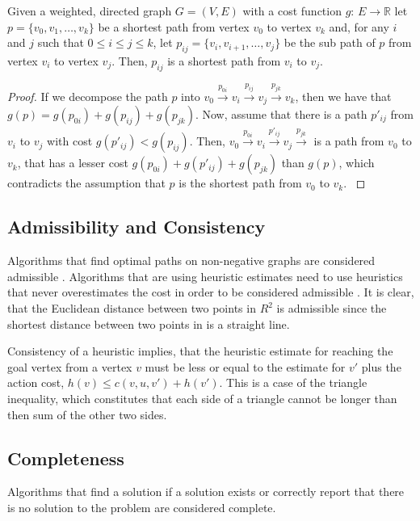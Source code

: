 \begin{lemma}
    Given a weighted, directed graph $G = (V,E)$ with a cost function $g$: $E \rightarrow \mathbb{R}$ let $p = \{v_0, v_1,\ldots, v_k\}$ be a shortest path from vertex $v_0$ to vertex $v_k$ and, for any $i$ and $j$ such that $0 \leq i \leq j \leq k$, let $p_{ij} = \{v_i, v_{i+1},\ldots, v_j\}$ be the sub path of $p$ from vertex $v_i$ to vertex $v_j$. Then, $p_{ij}$ is a shortest path from $v_i$ to $v_j$.
\end{lemma}
 
\begin{proof}
    If we decompose the path $p$ into $v_0 \xrightarrow{p_{0i}} v_i \xrightarrow{p_{ij}} v_j \xrightarrow{p_{jk}} v_k$, then we have that $g(p) = g(p_{0i}) + g(p_{ij}) + g(p_{jk})$. Now, assume that there is a path $p'_{ij}$ from $v_i$ to $v_j$ with cost $g(p'_{ij}) < g(p_{ij})$. Then, $v_0 \xrightarrow{p_{0i}} v_i \xrightarrow{p'_{ij}} v_j \xrightarrow{p_{jk}}$ is a path from $v_0$ to $v_k$, that has a lesser cost $g(p_{0i}) + g(p'_{ij}) + g(p_{jk})$ than $g(p)$, which contradicts the assumption that $p$ is the shortest path from $v_0$ to $v_k$. \cite{Cormen.2009}
\end{proof}

\subsection{Admissibility and Consistency}
Algorithms that find optimal paths on non-negative graphs are considered admissible \cite{Hart.1968}. Algorithms that are using heuristic estimates need to use heuristics that never overestimates the cost in order to be considered admissible \cite{Russell.2010}. It is clear, that the Euclidean distance between two points in $R^2$ is admissible since the shortest distance between two points in is a straight line.

Consistency of a heuristic implies, that the heuristic estimate for reaching the goal vertex from a vertex $v$ must be less or equal to the estimate for $v'$ plus the action cost,  $h(v) \leq c(v, u, v')+ h(v')$. This is a case of the triangle inequality, which constitutes that each side of a triangle cannot be longer than then sum of the other two sides. \cite{Russell.2010}

\subsection{Completeness}
Algorithms that find a solution if a solution exists or correctly report that there is no solution to the problem are considered complete. \cite{LaValle.2006,Russell.2010}

